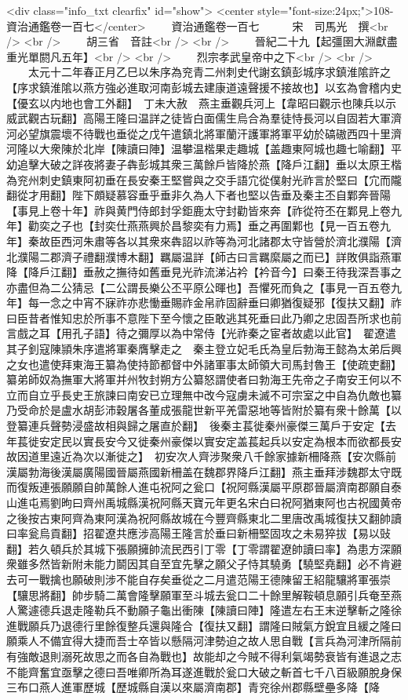 <div class="info_txt clearfix" id="show">
<center style="font-size:24px;">108-資治通鑑卷一百七</center>
  　　資治通鑑卷一百七　　　宋　司馬光　撰<br />
<br />
　　胡三省　音註<br />
<br />
　　晉紀二十九【起彊圉大淵獻盡重光單閼凡五年】<br />
<br />
　　烈宗孝武皇帝中之下<br />
<br />
　　太元十二年春正月乙巳以朱序為兖青二州刺史代謝玄鎮彭城序求鎮淮隂許之【序求鎮淮隂以燕方強必進取河南彭城去建康道遠聲援不接故也】以玄為會稽内史【優玄以内地也會工外翻】　丁未大赦　燕主垂觀兵河上【韋昭曰觀示也陳兵以示威武觀古玩翻】高陽王隆曰温詳之徒皆白面儒生烏合為羣徒恃長河以自固若大軍濟河必望旗震壞不待戰也垂從之戊午遣鎮北將軍蘭汗護軍將軍平幼於碻磝西四十里濟河隆以大衆陳於北岸【陳讀曰陣】温攀温楷果走趣城【盖趣東阿城也趣七喻翻】平幼追擊大破之詳夜將妻子犇彭城其衆三萬餘戶皆降於燕【降戶江翻】垂以太原王楷為兖州刺史鎮東阿初垂在長安秦王堅嘗與之交手語宂從僕射光祚言於堅曰【宂而隴翻從才用翻】陛下頗疑慕容垂乎垂非久為人下者也堅以告垂及秦主丕自鄴奔晉陽【事見上卷十年】祚與黄門侍郎封孚鉅鹿太守封勸皆來奔【祚從符丕在鄴見上卷九年】勸奕之子也【封奕仕燕燕興於昌黎奕有力焉】垂之再圍鄴也【見一百五卷九年】秦故臣西河朱肅等各以其衆來犇詔以祚等為河北諸郡太守皆營於濟北濮陽【濟北濮陽二郡濟子禮翻濮博木翻】羈屬温詳【師古曰言羈縻屬之而已】詳敗俱詣燕軍降【降戶江翻】垂赦之撫待如舊垂見光祚流涕沾衿【衿音今】曰秦王待我深吾事之亦盡但為二公猜忌【二公謂長樂公丕平原公暉也】吾懼死而負之【事見一百五卷九年】每一念之中宵不寐祚亦悲慟垂賜祚金帛祚固辭垂曰卿猶復疑邪【復扶又翻】祚曰臣昔者惟知忠於所事不意陛下至今懷之臣敢逃其死垂曰此乃卿之忠固吾所求也前言戲之耳【用孔子語】待之彌厚以為中常侍【光祚秦之宦者故處以此官】　翟遼遣其子釗寇陳頴朱序遣將軍秦膺擊走之　秦主登立妃毛氏為皇后勃海王懿為太弟后興之女也遣使拜東海王纂為使持節都督中外諸軍事太師領大司馬封魯王【使疏吏翻】纂弟師奴為撫軍大將軍并州牧封朔方公纂怒謂使者曰勃海王先帝之子南安王何以不立而自立乎長史王旅諫曰南安已立理無中改今寇虜未滅不可宗室之中自為仇敵也纂乃受命於是盧水胡彭沛穀屠各董成張龍世新平羌雷惡地等皆附於纂有衆十餘萬【以登纂連兵聲勢浸盛故相與歸之屠直於翻】　後秦主萇徙秦州豪傑三萬戶于安定【去年萇徙安定民以實長安今又徙秦州豪傑以實安定盖萇起兵以安定為根本而欲都長安故因道里遠近為次以漸徙之】　初安次人齊涉聚衆八千餘家據新柵降燕【安次縣前漢屬勃海後漢屬廣陽國晉屬燕國新柵盖在魏郡界降戶江翻】燕主垂拜涉魏郡太守既而復叛連張願願自帥萬餘人進屯祝阿之瓮口【祝阿縣漢屬平原郡晉屬濟南郡願自泰山進屯焉劉昫曰齊州禹城縣漢祝阿縣天寶元年更名宋白曰祝阿猶東阿也古祝國黄帝之後按古東阿齊為東阿漢為祝阿縣故城在今豐齊縣東北二里唐改禹城復扶又翻帥讀曰率瓮烏貢翻】招翟遼共應涉高陽王隆言於垂曰新柵堅固攻之未易猝拔【易以䜴翻】若久頓兵於其城下張願擁帥流民西引丁零【丁零謂翟遼帥讀曰率】為患方深願衆雖多然皆新附未能力鬬因其自至宜先擊之願父子恃其驍勇【驍堅堯翻】必不肯避去可一戰擒也願破則涉不能自存矣垂從之二月遣范陽王德陳留王紹龍驤將軍張崇【驤思將翻】帥步騎二萬會隆擊願軍至斗城去瓮口二十餘里解鞍頓息願引兵奄至燕人驚遽德兵退走隆勒兵不動願子龜出衝陳【陳讀曰陣】隆遣左右王末逆擊斬之隆徐進戰願兵乃退德行里餘復整兵還與隆合【復扶又翻】謂隆曰賊氣方銳宜且緩之隆曰願乘人不備宜得大捷而吾士卒皆以懸隔河津勢迫之故人思自戰【言兵為河津所隔前有強敵退則溺死故思之而各自為戰也】故能却之今賊不得利氣竭勢衰皆有進退之志不能齊奮宜亟擊之德曰吾唯卿所為耳遂進戰於瓮口大破之斬首七千八百級願脫身保三布口燕人進軍歷城【歷城縣自漢以來屬濟南郡】青兖徐州郡縣壁壘多降【降
